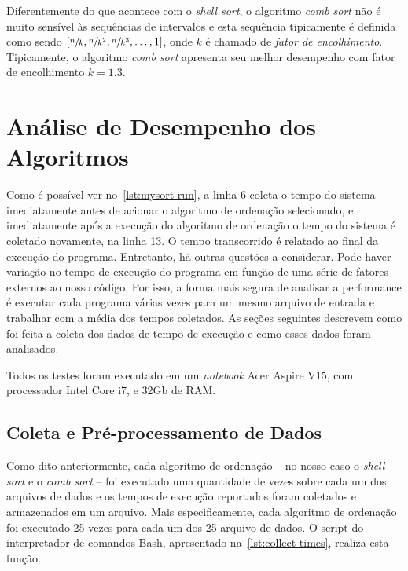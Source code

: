 \documentclass[a4paper,12pt]{scrartcl}
\begin{document}
Diferentemente do que acontece com o \emph{shell sort}, o algoritmo \emph{comb
  sort} não é muito sensível às sequências de intervalos e esta sequência
tipicamente é definida como sendo $[\sfrac{n}{k}, \sfrac{n}{k^2},
\sfrac{n}{k^3}, \ldots, 1]$, onde $k$ é chamado de \emph{fator de encolhimento}.
Tipicamente, o algoritmo \emph{comb sort} apresenta seu melhor desempenho com
fator de encolhimento $k = 1.3$.


\section{Análise de Desempenho dos Algoritmos}
\label{sec:analise-desempenho}

Como é possível ver no~\autoref{lst:mysort-run}, a linha 6 coleta o tempo do
sistema imediatamente antes de acionar o algoritmo de ordenação selecionado, e
imediatamente após a execução do algoritmo de ordenação o tempo do sistema é
coletado novamente, na linha 13. O tempo transcorrido é relatado ao final da
execução do programa. Entretanto, há outras questões a considerar. Pode haver
variação no tempo de execução do programa em função de uma série de fatores
externos ao nosso código. Por isso, a forma mais segura de analisar a
performance é executar cada programa várias vezes para um mesmo arquivo de
entrada e trabalhar com a média dos tempos coletados. As seções seguintes
descrevem como foi feita a coleta dos dados de tempo de execução e como esses
dados foram analisados.

Todos os testes foram executado em um \emph{notebook} Acer Aspire V15, com
processador Intel Core i7, e 32Gb de RAM.


\subsection{Coleta e Pré-processamento de Dados}
\label{sec:coleta-preproc}

Como dito anteriormente, cada algoritmo de ordenação -- no nosso caso o
\emph{shell sort} e o \emph{comb sort} -- foi executado uma quantidade de vezes
sobre cada um dos arquivos de dados e os tempos de execução reportados foram
coletados e armazenados em um arquivo. Mais especificamente, cada algoritmo de
ordenação foi executado 25 vezes para cada um dos 25 arquivo de dados. O script
do interpretador de comandos Bash, apresentado na~\autoref{lst:collect-times},
realiza esta função.
\end{document}
